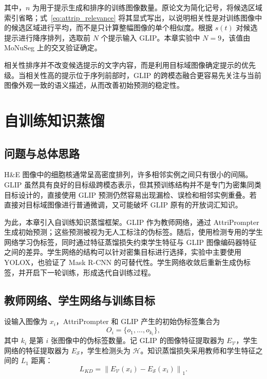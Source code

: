 其中，$n$ 为用于提示生成和排序的训练图像数量。原论文为简化记号，将候选区域索引省略；式~\ref{eq:attrip_relevance} 将其显式写出，以说明相关性是对训练图像中的候选区域进行平均，而不是只计算整幅图像的单个相似度。根据 $s(t)$ 对候选提示进行降序排列，选取前 $N$ 个提示输入 GLIP。本章实验中 $N=9$，该值由 MoNuSeg 上的交叉验证确定。

相关性排序并不改变候选提示的文字内容，而是利用目标域图像确定提示的优先级。当相关性高的提示位于序列前部时，GLIP 的跨模态融合更容易先关注与当前图像外观一致的语义描述，从而改善初始预测的稳定性。

\section{自训练知识蒸馏}

\subsection{问题与总体思路}

H\&E 图像中的细胞核通常呈高密度排列，许多相邻实例之间只有很小的间隔。GLIP 虽然具有良好的目标级跨模态表示，但其预训练结构并不是专门为密集同类目标设计的，直接使用 GLIP 预测仍然容易出现漏检、误检和相邻实例重叠。若直接对目标域图像进行普通微调，又可能破坏 GLIP 原有的开放词汇知识。

为此，本章引入自训练知识蒸馏框架。GLIP 作为教师网络，通过 AttriPrompter 生成初始预测；这些预测被视为无人工标注的伪标签。随后，使用检测专用的学生网络学习伪标签，同时通过特征蒸馏损失约束学生特征与 GLIP 图像编码器特征之间的差异。学生网络的结构可以针对密集目标进行选择，实验中主要使用 YOLOX，也验证了 Mask R-CNN 的可替代性。学生网络收敛后重新生成伪标签，并开启下一轮训练，形成迭代自训练过程。

\subsection{教师网络、学生网络与训练目标}

设输入图像为 $x_i$，AttriPrompter 和 GLIP 产生的初始伪标签集合为
\begin{equation}
O_i=\{o_1,\ldots,o_{k_i}\},
\end{equation}
其中 $k_i$ 是第 $i$ 张图像中的伪标签数量。记 GLIP 的图像特征提取器为 $E_{\mathcal V}$，学生网络的特征提取器为 $E_{\mathcal S}$，学生检测头为 $\mathcal H$。知识蒸馏损失采用教师和学生特征之间的 $L_1$ 距离：
\begin{equation}
\label{eq:attrip_kd}
L_{KD}=\left\|E_{\mathcal V}(x_i)-E_{\mathcal S}(x_i)\right\|_1.
\end{equation}

